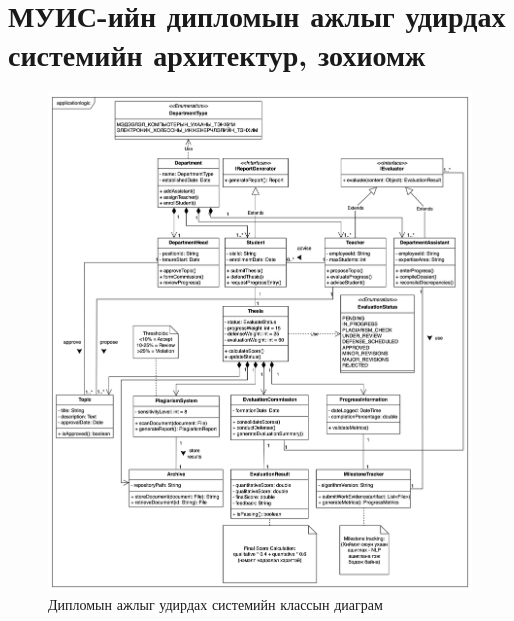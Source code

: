 \section{МУИС-ийн дипломын ажлыг удирдах системийн архитектур, зохиомж}

\begin{figure}
	\centering
	\includegraphics[width=15cm]{images/image.png}
	\caption{Дипломын ажлыг удирдах системийн классын диаграм}
	\label{fig:image}
\end{figure}